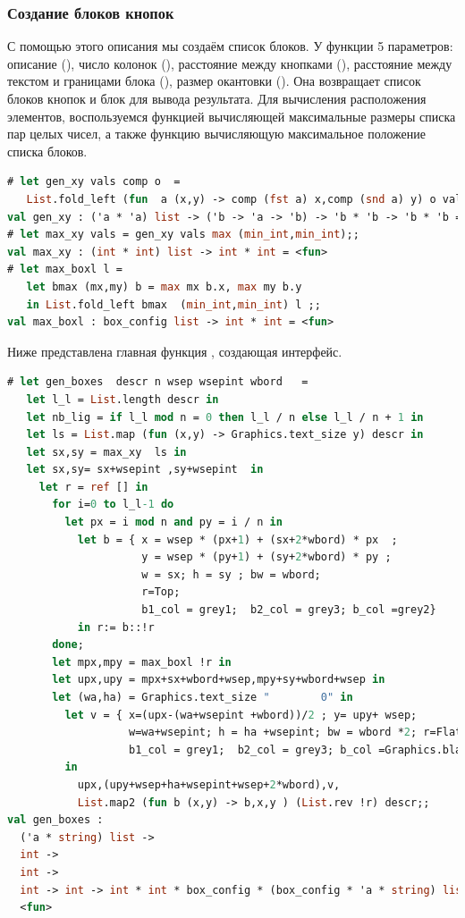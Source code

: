 \subsubsection{Создание блоков кнопок}

С помощью этого описания мы создаём список блоков. У функции  
5 параметров: описание (), число колонок (), расстояние 
между кнопками (), расстояние между текстом и границами блока 
(), размер окантовки (). Она возвращает список блоков 
кнопок и блок для вывода результата. Для вычисления расположения элементов, 
воспользуемся функцией  вычисляющей максимальные размеры списка 
пар целых чисел, а также функцию  вычисляющую максимальное 
положение списка блоков.

\begin{lstlisting}[language=OCaml]
# let gen_xy vals comp o  = 
   List.fold_left (fun  a (x,y) -> comp (fst a) x,comp (snd a) y) o vals ;;
val gen_xy : ('a * 'a) list -> ('b -> 'a -> 'b) -> 'b * 'b -> 'b * 'b = <fun>
# let max_xy vals = gen_xy vals max (min_int,min_int);;
val max_xy : (int * int) list -> int * int = <fun>
# let max_boxl l = 
   let bmax (mx,my) b = max mx b.x, max my b.y
   in List.fold_left bmax  (min_int,min_int) l ;;
val max_boxl : box_config list -> int * int = <fun>
\end{lstlisting}

Ниже представлена главная функция , создающая интерфейс.

\begin{lstlisting}[language=OCaml]
# let gen_boxes  descr n wsep wsepint wbord   = 
   let l_l = List.length descr in 
   let nb_lig = if l_l mod n = 0 then l_l / n else l_l / n + 1 in 
   let ls = List.map (fun (x,y) -> Graphics.text_size y) descr in
   let sx,sy = max_xy  ls in
   let sx,sy= sx+wsepint ,sy+wsepint  in 
     let r = ref [] in 
       for i=0 to l_l-1 do
         let px = i mod n and py = i / n in 
           let b = { x = wsep * (px+1) + (sx+2*wbord) * px  ; 
                     y = wsep * (py+1) + (sy+2*wbord) * py ;
                     w = sx; h = sy ; bw = wbord;
                     r=Top;
                     b1_col = grey1;  b2_col = grey3; b_col =grey2} 
           in r:= b::!r
       done;
       let mpx,mpy = max_boxl !r in 
       let upx,upy = mpx+sx+wbord+wsep,mpy+sy+wbord+wsep in
       let (wa,ha) = Graphics.text_size "        0" in 
         let v = { x=(upx-(wa+wsepint +wbord))/2 ; y= upy+ wsep;
                   w=wa+wsepint; h = ha +wsepint; bw = wbord *2; r=Flat ;
                   b1_col = grey1;  b2_col = grey3; b_col =Graphics.black} 
         in 
           upx,(upy+wsep+ha+wsepint+wsep+2*wbord),v,
           List.map2 (fun b (x,y) -> b,x,y ) (List.rev !r) descr;;
val gen_boxes :
  ('a * string) list ->
  int ->
  int ->
  int -> int -> int * int * box_config * (box_config * 'a * string) list =
  <fun>
\end{lstlisting}

